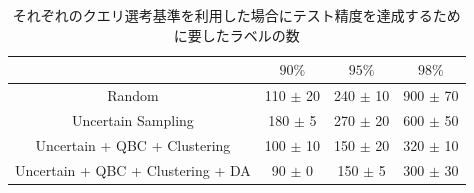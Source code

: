 \begin{table}[h]
    \caption{\label{table:mnist_samplenum_accuracy}それぞれのクエリ選考基準を利用した場合にテスト精度を達成するために要したラベルの数}
    \center
    \begin{tabular}{c|c|c|c} 
         & $90\%$ & $95\%$ & $98\%$ \\ \hline
        Random & 110 $\pm$ 20 & 240 $\pm$ 10 & 900 $\pm$ 70 \\
        Uncertain Sampling & 180 $\pm$ 5 & 270 $\pm$ 20  & 600 $\pm$ 50 \\
        Uncertain + QBC + Clustering & 100 $\pm$ 10 & 150 $\pm$ 20 & 320 $\pm$ 10 \\ 
        Uncertain + QBC + Clustering + DA & 90 $\pm$ 0 & 150 $\pm$ 5 & 300 $\pm$ 30 \\

    \end{tabular}
\end{table}

